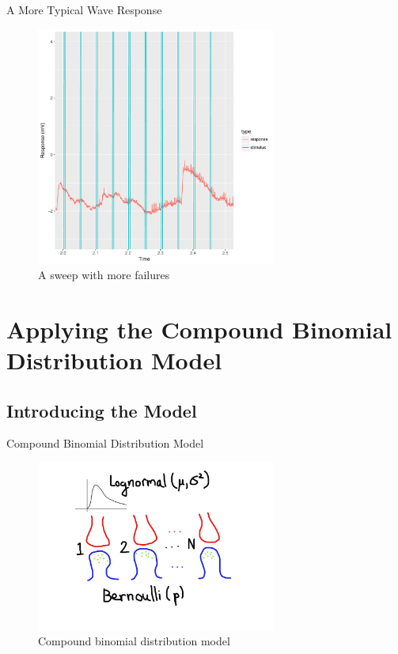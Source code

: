 \documentclass{beamer}
\begin{document}
\begin{frame}{A More Typical Wave Response}
  \begin{figure}
    \centering
    \includegraphics[width = 0.7\textwidth]{./wave-data-typical.pdf}
    \caption{A sweep with more failures}
  \end{figure}
\end{frame}


\section{Applying the Compound Binomial Distribution Model}

\subsection{Introducing the Model}

\begin{frame}{Compound Binomial Distribution Model}
  \begin{figure}
    \centering
    \includegraphics[width = 0.7\textwidth]{./compound-binomial-distribution.png}
    \caption{Compound binomial distribution model}
  \end{figure}
\end{frame}
\end{document}
